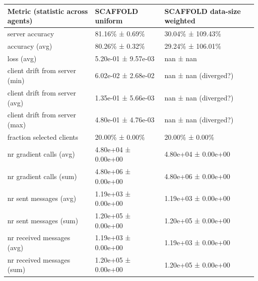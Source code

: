 \begin{tabular}{lll}
\hline
 Metric (statistic across agents)   & SCAFFOLD uniform    & SCAFFOLD data-size weighted   \\
\hline
 server accuracy                    & 81.16\% ± 0.69\%      & 30.04\% ± 109.43\%              \\
 accuracy (avg)                     & 80.26\% ± 0.32\%      & 29.24\% ± 106.01\%              \\
 loss (avg)                         & 5.20e-01 ± 9.57e-03 & nan ± nan                     \\
 client drift from server (min)     & 6.02e-02 ± 2.68e-02 & nan ± nan (diverged?)         \\
 client drift from server (avg)     & 1.35e-01 ± 5.66e-03 & nan ± nan (diverged?)         \\
 client drift from server (max)     & 4.80e-01 ± 4.76e-03 & nan ± nan (diverged?)         \\
 fraction selected clients          & 20.00\% ± 0.00\%      & 20.00\% ± 0.00\%                \\
 nr gradient calls (avg)            & 4.80e+04 ± 0.00e+00 & 4.80e+04 ± 0.00e+00           \\
 nr gradient calls (sum)            & 4.80e+06 ± 0.00e+00 & 4.80e+06 ± 0.00e+00           \\
 nr sent messages (avg)             & 1.19e+03 ± 0.00e+00 & 1.19e+03 ± 0.00e+00           \\
 nr sent messages (sum)             & 1.20e+05 ± 0.00e+00 & 1.20e+05 ± 0.00e+00           \\
 nr received messages (avg)         & 1.19e+03 ± 0.00e+00 & 1.19e+03 ± 0.00e+00           \\
 nr received messages (sum)         & 1.20e+05 ± 0.00e+00 & 1.20e+05 ± 0.00e+00           \\
\hline
\end{tabular}